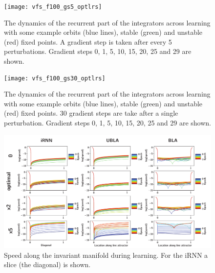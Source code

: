 \documentclass{article} %
\theoremstyle{definition}
\theoremstyle{remark}
\begin{document}
\begin{figure}[H]
     \centering
    \texttt{[image: vfs\_f100\_gs5\_optlrs]}
       \caption{The dynamics of the recurrent part of the integrators across learning with some example orbits (blue lines), stable (green) and unstable (red) fixed points. A gradient step is taken after every 5 perturbations. Gradient steps 0, 1, 5, 10, 15, 20, 25 and 29 are shown. }
         \label{fig:vfs5}
\end{figure}

\begin{figure}[H]
     \centering
    \texttt{[image: vfs\_f100\_gs30\_optlrs]}
       \caption{The dynamics of the recurrent part of the integrators across learning with some example orbits (blue lines), stable (green) and unstable (red) fixed points. 30 gradient steps are take after a single perturbation. Gradient steps 0, 1, 5, 10, 15, 20, 25 and 29 are shown. }
         \label{fig:vfs30}
\end{figure}


\begin{figure}[H]
     \centering
    \includegraphics[width=\textwidth]{speeds}
       \caption{Speed along the invariant manifold during learning. For the iRNN a slice (the diagonal) is shown.
       }
         \label{fig:speeds}
\end{figure}
\end{document}
